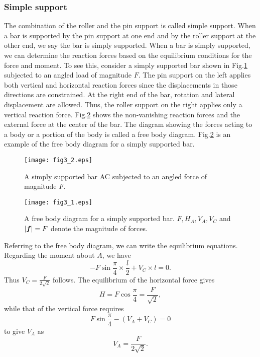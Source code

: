 ﻿\documentclass[10pt,a4j]{article}
\begin{document}
\subsubsection{Simple support}
The combination of the roller and the pin support is called simple support. 
When a bar is supported by the pin support at one end and by the roller support at the other end, we say the bar is simply supported. When a bar is simply supported, we can determine the reaction forces based on the equilibrium conditions for the force and moment. To see this, consider a simply supported bar shown in Fig.\ref{fig:fig3_2} subjected to an angled load of magnitude $F$. The pin support on the left applies both vertical and horizontal reaction forces since the displacements in those directions are constrained. At the right end of the bar, rotation and lateral displacement are allowed. Thus, the roller support on the right applies only a vertical reaction force. Fig.\ref{fig:fig3_1} shows the non-vanishing reaction forces and the external force at the center of the bar. The diagram showing the forces acting to a body or a portion of the body is called a free body diagram. Fig.\ref{fig:fig3_1} is an example of the free body diagram for a simply supported bar.
\begin{figure}[h]
	\begin{center}
	\texttt{[image: fig3\_2.eps]} 
	\end{center}
	\caption{A simply supported bar AC subjected to an angled force of magnitude $F$.}
	\label{fig:fig3_2}
\end{figure}
\begin{figure}[h]
	\begin{center}
	\texttt{[image: fig3\_1.eps]} 
	\end{center}
	\caption{
		A free body diagram for a simply supported bar.
		$F, H_A, V_A, V_C$ and $|\mbox{\boldmath $f$}|=F$ denote the magnitude of forces.
	}
	\label{fig:fig3_1}
\end{figure}
Referring to the free body diagram, we can write the equilibrium equations.
Regarding the moment about $A$, we have  
\[
	-F\sin\frac{\pi}{4}\times \frac{l}{2} + V_C\times l =0.
\]
Thus $V_C=\frac{F}{2\sqrt{2}}$ follows. 
The equilibrium of the horizontal force gives
\[
	H=F\cos\frac{\pi}{4}=\frac{F}{\sqrt{2}}, 
\]
while that of the vertical force requires 
\[
	F\sin\frac{\pi}{4} -(V_A+V_C)=0
\]
to give $V_A$ as 
\[
	V_A=\frac{F}{2\sqrt{2}}.
\]
\end{document}
